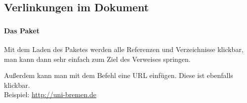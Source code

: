 \subsection{Verlinkungen im Dokument}

\begin{frame}
    \frametitle{\subsecname}
    \framesubtitle{Das Paket }
    
    Mit dem Laden des Paketes  werden alle Referenzen und Verzeichnisse klickbar, man kann dann sehr einfach zum Ziel des Verweises springen.
    
    \bigskip\pause
    Außerdem kann man mit dem Befehl  eine URL einfügen. Diese ist ebenfalls klickbar.\\
    Beispiel: \url{http://uni-bremen.de}
\end{frame}